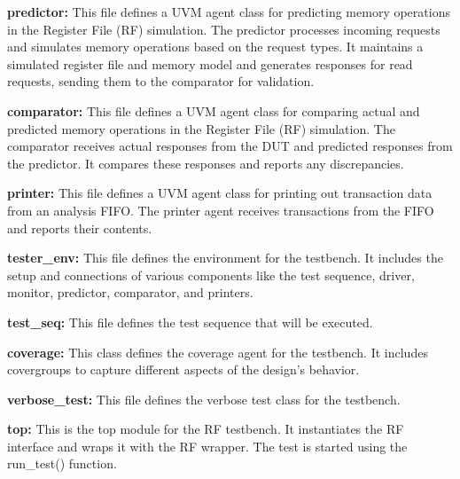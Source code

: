 \documentclass[12pt,a4paper]{report}
\begin{document}
\vspace*{0.3cm}

\textbf{predictor:} This file defines a UVM agent class for predicting memory operations in the Register File (RF) simulation. The predictor processes incoming requests and simulates memory operations based on the request types. It maintains a simulated register file and memory model and generates responses for read requests, sending them 
to the comparator for validation.
\vspace*{0.3cm}

\textbf{comparator:} This file defines a UVM agent class for comparing actual and  predicted memory operations in the Register File (RF) simulation. The comparator receives actual responses from the DUT and predicted responses from the predictor. It compares these responses and reports any discrepancies.

\vspace*{0.3cm}

\textbf{printer:} This file defines a UVM agent class for printing out transaction data  from an analysis FIFO. The printer agent receives transactions from the FIFO and reports their contents.

\vspace*{0.3cm}

\textbf{tester\_env:} This file defines the environment for the testbench. It includes the setup and connections of various components like the test sequence, driver, monitor, predictor, comparator, and printers.

\vspace*{0.3cm}

\textbf{test\_seq:} This file defines the test sequence that will be executed.

\vspace*{0.3cm}

\textbf{coverage:} This class defines the coverage agent for the testbench. It includes covergroups to capture different aspects of the design's behavior.

\vspace*{0.3cm}

\textbf{verbose\_test:} This file defines the verbose test class for the testbench.

\vspace*{0.3cm}

\textbf{top:} This is the top module for the RF testbench. It instantiates the RF interface and wraps it with the RF wrapper. The test is started using the run\_test() function.
\end{document}
